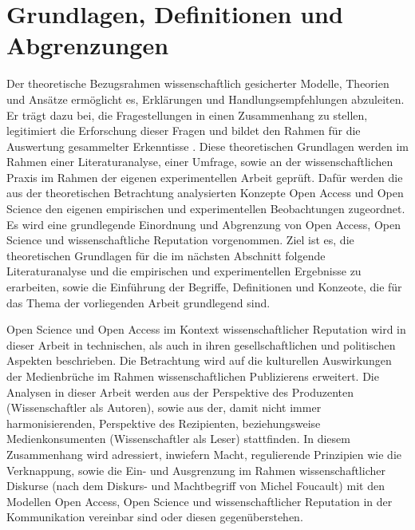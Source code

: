 \chapter{Grundlagen, Definitionen und Abgrenzungen}

Der theoretische Bezugsrahmen wissenschaftlich gesicherter Modelle, Theorien und Ansätze ermöglicht es, Erklärungen und Handlungsempfehlungen abzuleiten\cite{martin_2007_wissenschaftstheorie}. Er trägt dazu bei, die Fragestellungen in einen Zusammenhang zu stellen, legitimiert die Erforschung dieser Fragen und bildet den Rahmen für die Auswertung gesammelter Erkenntisse \cite{suchen}.
Diese theoretischen Grundlagen werden im Rahmen einer Literaturanalyse, einer Umfrage, sowie an der wissenschaftlichen Praxis im Rahmen der eigenen experimentellen Arbeit geprüft. Dafür werden die aus der theoretischen Betrachtung analysierten Konzepte Open Access und Open Science den eigenen empirischen und experimentellen Beobachtungen zugeordnet. Es wird eine grundlegende Einordnung und Abgrenzung von Open Access, Open Science und wissenschaftliche Reputation vorgenommen. Ziel ist es, die theoretischen Grundlagen für die im nächsten Abschnitt folgende Literaturanalyse und die empirischen und experimentellen Ergebnisse zu erarbeiten, sowie die Einführung der Begriffe, Definitionen und Konzeote, die für das Thema der vorliegenden Arbeit grundlegend sind.

Open Science und Open Access im Kontext wissenschaftlicher Reputation wird in dieser Arbeit in technischen, als auch in ihren gesellschaftlichen und politischen Aspekten beschrieben. Die Betrachtung wird auf die kulturellen Auswirkungen der Medienbrüche im Rahmen wissenschaftlichen Publizierens erweitert. Die Analysen in dieser Arbeit werden aus der Perspektive des Produzenten (Wissenschaftler als Autoren), sowie aus der, damit nicht immer harmonisierenden, Perspektive des Rezipienten, beziehungsweise Medienkonsumenten (Wissenschaftler als Leser) stattfinden. In diesem Zusammenhang wird adressiert, inwiefern Macht, regulierende Prinzipien wie die Verknappung, sowie die Ein- und Ausgrenzung im Rahmen wissenschaftlicher Diskurse (nach dem Diskurs- und Machtbegriff von Michel Foucault) mit den Modellen Open Access, Open Science und wissenschaftlicher Reputation in der Kommunikation vereinbar sind oder diesen gegenüberstehen.


